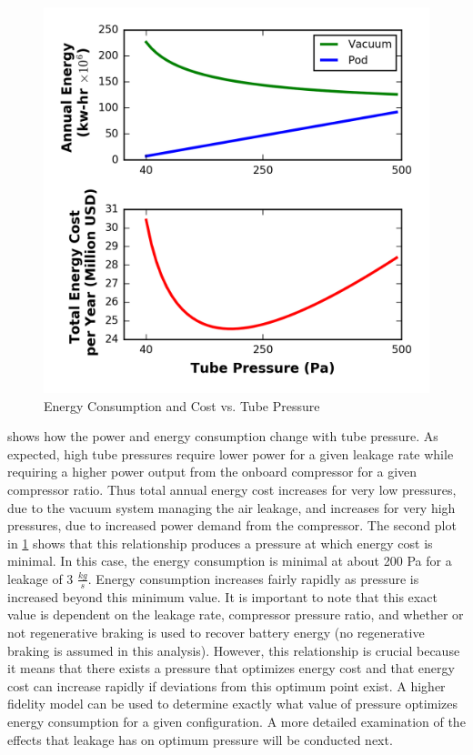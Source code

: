 \begin{figure}
    \centering
    \includegraphics{../../images/graphs/pressure_trades/pressure_vs_power_zoom.png}
    \caption{Energy Consumption and Cost vs. Tube Pressure}
    \label{fig:pow_demands_vs_tube_press}
\end{figure}

 shows how the power and energy consumption
change with tube pressure. As expected, high tube pressures require lower power
for a given leakage rate while requiring a higher power output from the onboard
compressor for a given compressor ratio. Thus total annual energy cost
increases for very low pressures, due to the vacuum system managing the air
leakage, and increases for very high pressures,
due to increased power demand from the compressor.
The second plot in \cref{fig:pow_demands_vs_tube_press} shows that this
relationship produces a pressure at which energy cost is minimal. In this case,
the energy consumption is minimal at about 200 Pa for a leakage of 3 $\frac{kg}{s}$.
Energy consumption increases
fairly rapidly as pressure is increased beyond this minimum value. It is
important to note that this exact value is dependent on the leakage rate,
compressor pressure ratio, and whether or not regenerative braking is used to
recover battery energy (no regenerative braking is assumed in this analysis).
However, this relationship is crucial because it means that there exists a
pressure that optimizes energy cost and that energy cost can increase rapidly
if deviations from this optimum point exist. A higher fidelity model can be
used to determine exactly what value of pressure optimizes energy consumption
for a given configuration. A more detailed examination of the effects that
leakage has on optimum pressure will be conducted next.
